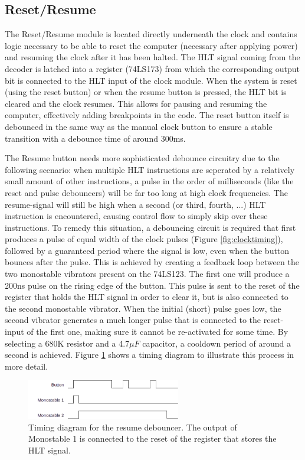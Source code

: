 \subsection{Reset/Resume} \label{sec:resetresume}
The Reset/Resume module is located directly underneath the clock and contains logic necessary to be able to reset the computer (necessary after applying power) and resuming the clock after it has been halted. The HLT signal coming from the decoder is latched into a register (74LS173) from which the corresponding output bit is connected to the HLT input of the clock module. When the system is reset (using the reset button) or when the resume button is pressed, the HLT bit is cleared and the clock resumes. This allows for pausing and resuming the computer, effectively adding breakpoints in the code. The reset button itself is debounced in the same way as the manual clock button to ensure a stable transition with a debounce time of around 300ms.

The Resume button needs more sophisticated debounce circuitry due to the following scenario: when multiple HLT instructions are seperated by a relatively small amount of other instructions, a pulse in the order of milliseconds (like the reset and pulse debouncers) will be far too long at high clock frequencies. The resume-signal will still be high when a second (or third, fourth, ...) HLT instruction is encountered, causing control flow to simply skip over these instructions. To remedy this situation, a debouncing circuit is required that first produces a pulse of equal width of the clock pulses (Figure \ref{fig:clocktiming}), followed by a guaranteed period where the signal is low, even when the button bounces after the pulse. This is achieved by creating a feedback loop between the two monostable vibrators present on the 74LS123. The first one will produce a 200ns pulse on the rising edge of the button. This pulse is sent to the reset of the register that holds the HLT signal in order to clear it, but is also connected to the second monostable vibrator. When the initial (short) pulse goes low, the second vibrator generates a much longer pulse that is connected to the reset-input of the first one, making sure it cannot be re-activated for some time. By selecting a 680K resistor and a 4.7$\mu F$ capacitor, a cooldown period of around a second is achieved. Figure \ref{fig:resumedebounce} shows a timing diagram to illustrate this process in more detail. 

\begin{figure}[H]
  \centering
  \includegraphics[width=0.6\textwidth]{img/resumedebounce}
  \caption{Timing diagram for the resume debouncer. The output of Monostable 1 is connected to the reset of the register that stores the HLT signal.}
  \label{fig:resumedebounce}
\end{figure}


